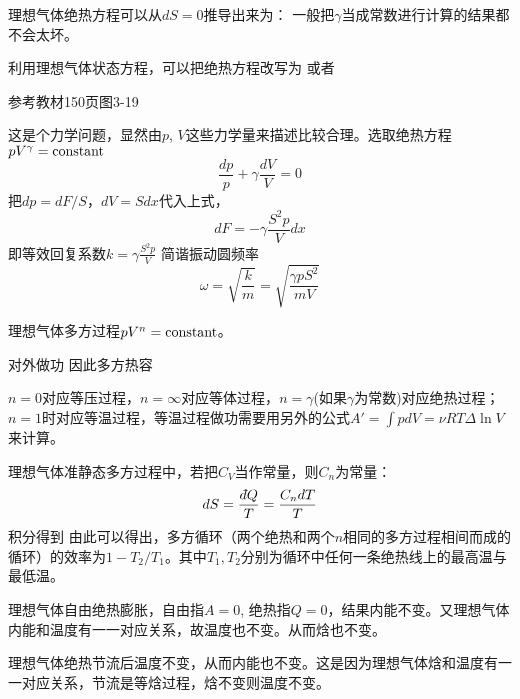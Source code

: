 \documentclass[CJK]{beamer}
\begin{document}
\begin{frame}
  \bch
  理想气体绝热方程可以从$dS = 0$推导出来为：
  一般把$\gamma$当成常数进行计算的结果都不会太坏。

  利用理想气体状态方程，可以把绝热方程改写为
  或者
  \ech
\end{frame}

\begin{frame}
\bch
参考教材150页图3-19

这是个力学问题，显然由$p$, $V$这些力学量来描述比较合理。选取绝热方程$pV^\gamma = \mathrm{constant}$
$$ \frac{dp}{p} + \gamma \frac{dV}{V} = 0$$
把$dp = dF/S$，$dV = S dx$代入上式，
$$ dF = -\gamma \frac{S^2p}{V} dx $$
即等效回复系数$k =\gamma \frac{S^2p}{V} $ 简谐振动圆频率
$$\omega = \sqrt{\frac{k}{m}} = \sqrt{\frac{\gamma p S^2}{mV}}$$
\ech
\end{frame}

\begin{frame}
  \bch
  理想气体多方过程$pV^n = \mathrm{constant}$。

  对外做功
  因此多方热容

  $n=0$对应等压过程，$n=\infty$对应等体过程，$n=\gamma$(如果$\gamma$为常数)对应绝热过程；$n=1$时对应等温过程，等温过程做功需要用另外的公式$A' = \int pdV = \nu R T\Delta \ln V$来计算。


  \ech
\end{frame}


\begin{frame}
  \bch
  理想气体准静态多方过程中，若把$C_V$当作常量，则$C_n$为常量：
  $$dS = \frac{\dbar Q}{T} = \frac{C_n dT}{T}$$
  积分得到
由此可以得出，多方循环（两个绝热和两个$n$相同的多方过程相间而成的循环）的效率为$1-T_2/T_1$。其中$T_1, T_2$分别为循环中任何一条绝热线上的最高温与最低温。
  \ech
\end{frame}

\begin{frame}
  \bch
  \bitem
\item{理想气体自由绝热膨胀，自由指$A=0$, 绝热指$Q=0$，结果内能不变。又理想气体内能和温度有一一对应关系，故温度也不变。从而焓也不变。}
\item{理想气体绝热节流后温度不变，从而内能也不变。这是因为理想气体焓和温度有一一对应关系，节流是等焓过程，焓不变则温度不变。}
  \eitem
  \ech
\end{frame}
\end{document}
